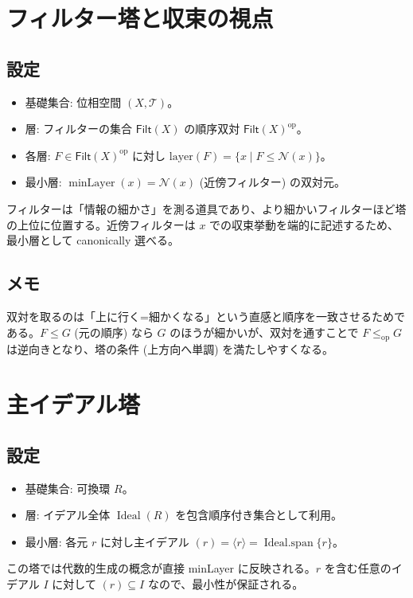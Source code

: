 \documentclass[11pt]{ltjsarticle}
\begin{document}
\section{フィルター塔と収束の視点}
\subsection*{設定}
\begin{itemize}
  \item 基礎集合: 位相空間 $(X,\mathcal{T})$。
  \item 層: フィルターの集合 $\mathsf{Filt}(X)$ の順序双対 $\mathsf{Filt}(X)^{\mathrm{op}}$。
  \item 各層: $F \in \mathsf{Filt}(X)^{\mathrm{op}}$ に対し $\text{layer}(F) = \{x \mid F \le \mathcal{N}(x)\}$。
  \item 最小層: $\operatorname{minLayer}(x) = \mathcal{N}(x)$ (近傍フィルター) の双対元。
\end{itemize}
フィルターは「情報の細かさ」を測る道具であり、より細かいフィルターほど塔の上位に位置する。近傍フィルターは $x$ での収束挙動を端的に記述するため、最小層として canonically 選べる。

\subsection*{メモ}
双対を取るのは「上に行く=細かくなる」という直感と順序を一致させるためである。$F \le G$ (元の順序) なら $G$ のほうが細かいが、双対を通すことで $F \le_{\mathrm{op}} G$ は逆向きとなり、塔の条件 (上方向へ単調) を満たしやすくなる。

\section{主イデアル塔}
\subsection*{設定}
\begin{itemize}
  \item 基礎集合: 可換環 $R$。
  \item 層: イデアル全体 $\operatorname{Ideal}(R)$ を包含順序付き集合として利用。
  \item 最小層: 各元 $r$ に対し主イデアル $(r) = \langle r \rangle = \operatorname{Ideal.span}\{r\}$。
\end{itemize}
この塔では代数的生成の概念が直接 minLayer に反映される。$r$ を含む任意のイデアル $I$ に対して $(r) \subseteq I$ なので、最小性が保証される。
\end{document}
